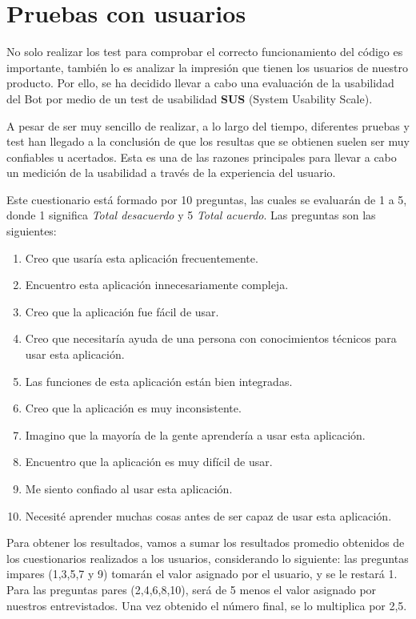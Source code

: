 \chapter{Pruebas con usuarios}

No solo realizar los test para comprobar el correcto funcionamiento del código es importante, también lo es analizar la impresión que tienen los usuarios de nuestro producto. Por ello, se ha decidido llevar a cabo una evaluación de la usabilidad del Bot por medio de un test de usabilidad \textbf{SUS} (System Usability Scale).

A pesar de ser muy sencillo de realizar, a lo largo del tiempo, diferentes pruebas y test han llegado a la conclusión de que los resultas que se obtienen suelen ser muy confiables u acertados. Esta es una de las razones principales para llevar a cabo un medición de la usabilidad a través de la experiencia del usuario.

Este cuestionario está formado por 10 preguntas, las cuales se evaluarán de 1 a 5, donde 1 significa \textit{Total desacuerdo} y 5 \textit{Total acuerdo}. Las preguntas son las siguientes:

\begin{enumerate}
	\item Creo que usaría esta aplicación frecuentemente.
	\item Encuentro esta aplicación innecesariamente compleja.
	\item Creo que la aplicación fue fácil de usar.
	\item Creo que necesitaría ayuda de una persona con conocimientos técnicos para usar esta aplicación.
	\item Las funciones de esta aplicación están bien integradas.
	\item Creo que la aplicación es muy inconsistente.
	\item Imagino que la mayoría de la gente aprendería a usar esta aplicación.
	\item Encuentro que la aplicación es muy difícil de usar.
	\item Me siento confiado al usar esta aplicación.
	\item Necesité aprender muchas cosas antes de ser capaz de usar esta aplicación.
\end{enumerate}

Para obtener los resultados, vamos a sumar los resultados promedio obtenidos de los cuestionarios realizados a los usuarios, considerando lo siguiente: las preguntas impares (1,3,5,7 y 9) tomarán el valor asignado por el usuario, y se le restará 1. Para las preguntas pares (2,4,6,8,10), será de 5 menos el valor asignado por nuestros entrevistados. Una vez obtenido el número final, se lo multiplica por 2,5.

